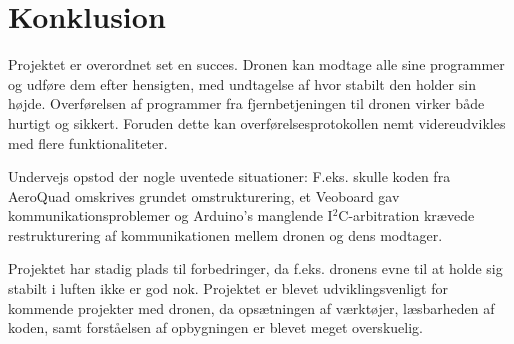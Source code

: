 \documentclass[Main]{subfiles}
\begin{document}
\chapter{Konklusion}

Projektet er overordnet set en succes.
Dronen kan modtage alle sine programmer og udføre dem efter hensigten, med undtagelse af hvor stabilt den holder sin højde.
Overførelsen af programmer fra fjernbetjeningen til dronen virker både hurtigt og sikkert.
Foruden dette kan overførelsesprotokollen nemt videreudvikles med flere funktionaliteter.

Undervejs opstod der nogle uventede situationer: F.eks. skulle koden fra AeroQuad omskrives grundet omstrukturering, et Veoboard gav kommunikationsproblemer og Arduino's manglende I$^2$C-arbitration krævede restrukturering af kommunikationen mellem dronen og dens modtager.

Projektet har stadig plads til forbedringer, da f.eks. dronens evne til at holde sig stabilt i luften ikke er god nok.
Projektet er blevet udviklingsvenligt for kommende projekter med dronen, da opsætningen af værktøjer, læsbarheden af koden, samt forståelsen af opbygningen er blevet meget overskuelig.
\end{document}
